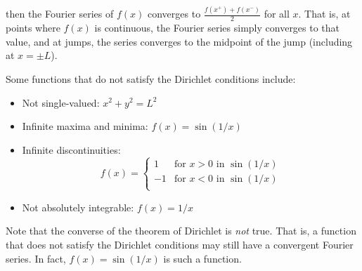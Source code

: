 then the Fourier series of $f(x)$ converges to $\frac{f(x^+) + f(x^-)}{2}$ for all $x$. That is, at points where $f(x)$ is continuous, the Fourier series simply converges to that value, and at jumps, the series converges to the midpoint of the jump (including at $x = \pm L$).

\hln
\vsp

Some functions that do not satisfy the Dirichlet conditions include:

\begin{itemize}
    \item Not single-valued: $x^2 + y^2 = L^2$
    \item Infinite maxima and minima: $f(x) = \sin(1/x)$
    \item Infinite discontinuities: \begin{equation*}
              f(x) = \begin{cases}
                  1  & \text{for } x > 0 \text{ in } \sin(1/x) \\
                  -1 & \text{for } x < 0 \text{ in } \sin(1/x) \\
              \end{cases}
          \end{equation*}
    \item Not absolutely integrable: $f(x) = 1/x$
\end{itemize}

Note that the converse of the theorem of Dirichlet is \emph{not} true. That is, a function that does not satisfy the Dirichlet conditions may still have a convergent Fourier series. In fact, $f(x) = \sin(1/x)$ is such a function.